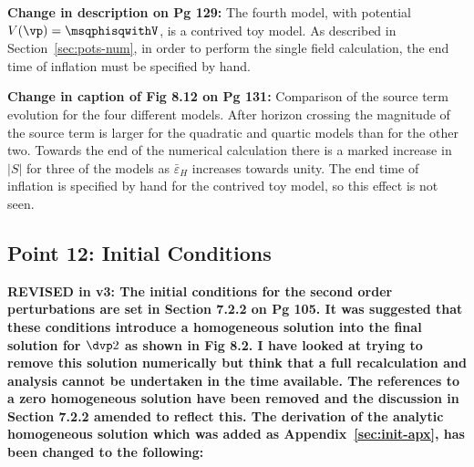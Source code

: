 \textbf{Change in description on Pg 129:}
The fourth model, with potential $V(\vp)=\msqphisqwithV$, is a contrived toy model.
As described in Section~\ref{sec:pots-num}, in order to perform the single field
calculation, the end time of inflation must be specified by hand. 

\textbf{Change in caption of Fig 8.12 on Pg 131:}
Comparison of the
source term
evolution for the four different models. After horizon crossing the magnitude of the
source term is larger for the quadratic and quartic models than for the other two.
Towards the end of the numerical calculation there is a marked increase in $|S|$ for
three of the models as $\bar{\varepsilon}_H$ increases towards unity. The end time of
inflation is specified by hand for the contrived toy model, so this effect is
not seen.

\subsection{Point 12: Initial Conditions}
\textbf{REVISED in v3: The initial conditions for the second order perturbations are set in Section 7.2.2 on Pg
105. It was suggested that these conditions introduce a homogeneous solution into the
final solution for $\dvp2$ as shown in Fig 8.2. I have looked at trying to remove this solution
numerically but think that a full recalculation and analysis cannot be undertaken in the time available.
The references to a zero homogeneous solution have been removed and the discussion in Section 7.2.2 amended
to reflect this. The derivation of the analytic homogeneous solution which was added as
Appendix~\ref{sec:init-apx}, has been changed to the following:}

